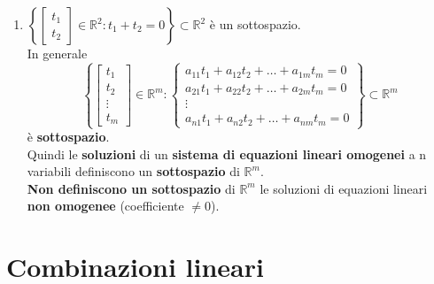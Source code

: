 \documentclass[a4paper, 12pt]{report}
\begin{document}
                    \begin{enumerate}
                        \item $ \left \{
                                \begin{bmatrix}
                                t_1\\
                                t_2
                                \end{bmatrix}
                                \in \mathbb{R}^2 : t_1+t_2=0
                                \right \}\subset \mathbb{R}^2
                                $ 
                                è un sottospazio.\\[2pt]
                                In generale
                                $$ \left \{
                                \begin{bmatrix}
                                t_1\\
                                t_2\\
                                \vdots\\
                                t_m
                                \end{bmatrix}
                                \in \mathbb{R}^m : 
                                \begin{cases}
                                    a_{11}t_1+a_{12}t_2+\dots+a_{1m}t_m=0\\
                                    a_{21}t_1+a_{22}t_2+\dots+a_{2m}t_m=0\\
                                    \vdots\\
                                    a_{n1}t_1+a_{n2}t_2+\dots+a_{nm}t_m=0
                                \end{cases}
                                \right \}\subset \mathbb{R}^m
                                $$
                                è \textbf{sottospazio}.\\
                                Quindi le \textbf{soluzioni} di un \textbf{sistema di equazioni lineari omogenei} a n
                                variabili definiscono un \textbf{sottospazio} di $\mathbb{R}^m$.\\
                                \textbf{Non definiscono un sottospazio} di $\mathbb{R}^m$ le soluzioni di equazioni lineari \textbf{non omogenee} (coefficiente $\neq 0$).
                    \end{enumerate}
    \chapter{Combinazioni lineari}
\end{document}
